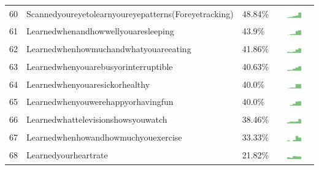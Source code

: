 \documentclass[a4paper,12pt]{article}
\begin{document}
\begin{longtable}{| p{0.5cm} | p{7cm} | p{1cm} | c |}
60 & Scannedyoureyetolearnyoureyepatterns(Foreyetracking) & 48.84\% & \includegraphics[width = 2cm, height = 0.5cm]{scannedyoureyetolearnyoureyepatterns(foreyetracking)FRIENDS} \\  
61 & Learnedwhenandhowwellyouaresleeping & 43.9\% & \includegraphics[width = 2cm, height = 0.5cm]{learnedwhenandhowwellyouaresleepingFRIENDS} \\  
62 & Learnedwhenhowmuchandwhatyouareeating & 41.86\% & \includegraphics[width = 2cm, height = 0.5cm]{learnedwhenhowmuchandwhatyouareeatingFRIENDS} \\  
63 & Learnedwhenyouarebusyorinterruptible & 40.63\% & \includegraphics[width = 2cm, height = 0.5cm]{learnedwhenyouarebusyorinterruptibleFRIENDS} \\  
64 & Learnedwhenyouaresickorhealthy & 40.0\% & \includegraphics[width = 2cm, height = 0.5cm]{learnedwhenyouaresickorhealthyFRIENDS} \\  
65 & Learnedwhenyouwerehappyorhavingfun & 40.0\% & \includegraphics[width = 2cm, height = 0.5cm]{learnedwhenyouwerehappyorhavingfunFRIENDS} \\  
66 & Learnedwhattelevisionshowsyouwatch & 38.46\% & \includegraphics[width = 2cm, height = 0.5cm]{learnedwhattelevisionshowsyouwatchFRIENDS} \\  
67 & Learnedwhenhowandhowmuchyouexercise & 33.33\% & \includegraphics[width = 2cm, height = 0.5cm]{learnedwhenhowandhowmuchyouexerciseFRIENDS} \\  
68 & Learnedyourheartrate & 21.82\% & \includegraphics[width = 2cm, height = 0.5cm]{learnedyourheartrateFRIENDS} \\  

\end{longtable}
\end{document}
